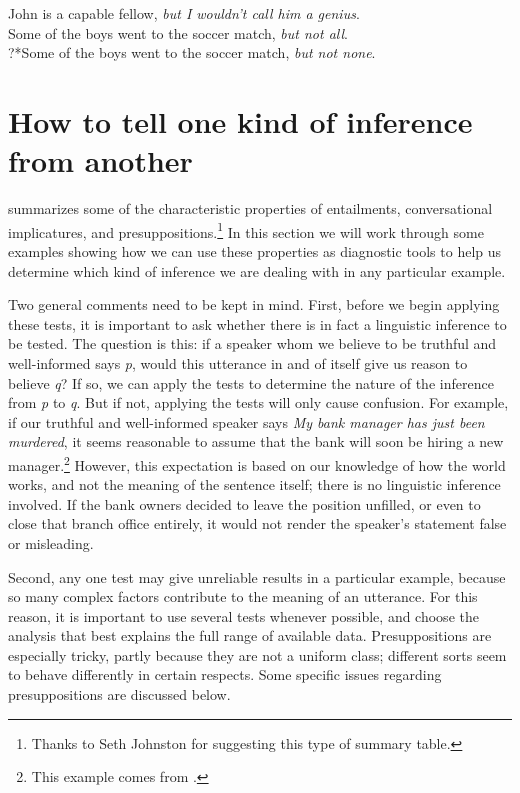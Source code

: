 \ea \label{ex:8.21}
\ea John is a capable fellow, \textit{but I wouldn’t call him a genius}.\\
\ex Some of the boys went to the soccer match, \textit{but not all}.\\
\ex ?*Some of the boys went to the soccer match, \textit{but not none}.
                       \z
\z

\section{How to tell one kind of inference from another}\label{sec:8.6}

 summarizes some of the characteristic properties of entailments, conversational implicatures, and presuppositions.\footnote{Thanks to Seth Johnston for suggesting this type of summary table.} In this section we will work through some examples showing how we can use these properties as diagnostic tools to help us determine which kind of inference we are dealing with in any particular example.



Two general comments need to be kept in mind. First, before we begin applying these tests, it is important to ask whether there is in fact a linguistic inference to be tested. The question is this: if a speaker whom we believe to be truthful and well-informed says \textit{p}, would this utterance in and of itself give us reason to believe \textit{q}? If so, we can apply the tests to determine the nature of the inference from \textit{p} to \textit{q}. But if not, applying the tests will only cause confusion. For example, if our truthful and well-informed speaker says \textit{My bank manager has just been murdered}, it seems reasonable to assume that the bank will soon be hiring a new manager.\footnote{This example comes from \citet[54]{Saeed2009}.} However, this expectation is based on our knowledge of how the world works, and not the meaning of the sentence itself; there is no linguistic inference involved. If the bank owners decided to leave the position unfilled, or even to close that branch office entirely, it would not render the speaker’s statement false or misleading.



Second, any one test may give unreliable results in a particular example, because so many complex factors contribute to the meaning of an utterance. For this reason, it is important to use several tests whenever possible, and choose the analysis that best explains the full range of available data. Presuppositions are especially tricky, partly because they are not a uniform class; different sorts seem to behave differently in certain respects. Some specific issues regarding presuppositions are discussed below.


